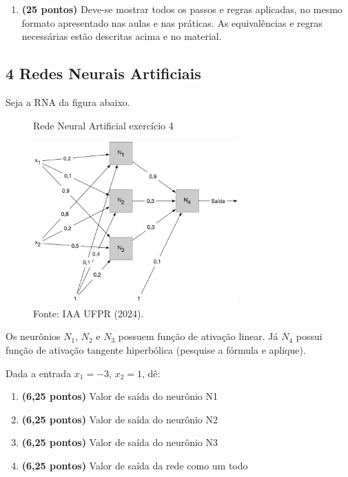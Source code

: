     \begin{enumerate}[label=\alph*)]
        \item \textbf{(25 pontos)} Deve-se mostrar todos os passos e regras aplicadas, no mesmo formato apresentado nas aulas e nas práticas. As equivalências e regras necessárias estão descritas acima e no material.
    \end{enumerate}

\subsection*{\textbf{4 Redes Neurais Artificiais}}
    Seja a RNA da figura abaixo.
    
    \begin{figure}[H]
        \centering
        \caption{Rede Neural Artificial exercício 4}
        \includegraphics[width=0.7\textwidth]{apendices/fig/1_IAA001_3.png} 
        \caption*{Fonte: IAA UFPR (2024).}
    \end{figure}

    Os neurônios $N_1$, $N_2$ e $N_3$ possuem função de ativação linear. Já $N_4$ possui função de ativação tangente hiperbólica (pesquise a fórmula e aplique).

    Dada a entrada $x_1 = -3$, $x_2 = 1$, dê:
    \begin{enumerate}[label=\alph*)]
        \item \textbf{(6,25 pontos)} Valor de saída do neurônio N1
        \item \textbf{(6,25 pontos)} Valor de saída do neurônio N2
        \item \textbf{(6,25 pontos)} Valor de saída do neurônio N3
        \item \textbf{(6,25 pontos)} Valor de saída da rede como um todo
    \end{enumerate}

